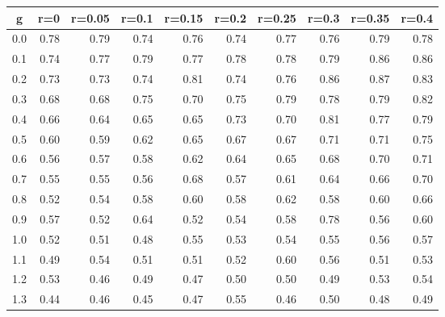 %
\begin{table}[!tbp]
 \begin{center}
 \begin{tabular}{rrrrrrrrrr}\hline\hline
\multicolumn{1}{c}{g}&\multicolumn{1}{c}{r=0}&\multicolumn{1}{c}{r=0.05}&\multicolumn{1}{c}{r=0.1}&\multicolumn{1}{c}{r=0.15}&\multicolumn{1}{c}{r=0.2}&\multicolumn{1}{c}{r=0.25}&\multicolumn{1}{c}{r=0.3}&\multicolumn{1}{c}{r=0.35}&\multicolumn{1}{c}{r=0.4}\tabularnewline
\hline
0.0&0.78&0.79&0.74&0.76&0.74&0.77&0.76&0.79&0.78\tabularnewline
0.1&0.74&0.77&0.79&0.77&0.78&0.78&0.79&0.86&0.86\tabularnewline
0.2&0.73&0.73&0.74&0.81&0.74&0.76&0.86&0.87&0.83\tabularnewline
0.3&0.68&0.68&0.75&0.70&0.75&0.79&0.78&0.79&0.82\tabularnewline
0.4&0.66&0.64&0.65&0.65&0.73&0.70&0.81&0.77&0.79\tabularnewline
0.5&0.60&0.59&0.62&0.65&0.67&0.67&0.71&0.71&0.75\tabularnewline
0.6&0.56&0.57&0.58&0.62&0.64&0.65&0.68&0.70&0.71\tabularnewline
0.7&0.55&0.55&0.56&0.68&0.57&0.61&0.64&0.66&0.70\tabularnewline
0.8&0.52&0.54&0.58&0.60&0.58&0.62&0.58&0.60&0.66\tabularnewline
0.9&0.57&0.52&0.64&0.52&0.54&0.58&0.78&0.56&0.60\tabularnewline
1.0&0.52&0.51&0.48&0.55&0.53&0.54&0.55&0.56&0.57\tabularnewline
1.1&0.49&0.54&0.51&0.51&0.52&0.60&0.56&0.51&0.53\tabularnewline
1.2&0.53&0.46&0.49&0.47&0.50&0.50&0.49&0.53&0.54\tabularnewline
1.3&0.44&0.46&0.45&0.47&0.55&0.46&0.50&0.48&0.49\tabularnewline
\hline
\end{tabular}

\end{center}

\end{table}

